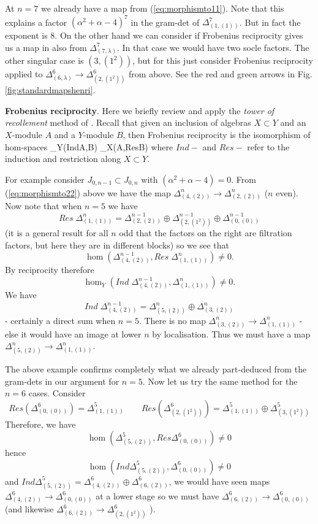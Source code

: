 At $n=7$ we already have a map from (\ref{eq:morphismto11}). 
Note that this explains a factor $(\alpha^2+\alpha-4)^7$ in the gram-det of $\Delta^7_{(1,(1))}$. 
But in fact the exponent is 8. 
On the other hand we can consider if Frobenius reciprocity gives us a map in 
also from $ \Delta^7_{(7,\lambda)}$.  
In that case we would have two socle factors. 
The other singular case is $(3,(1^2))$, but for this just consider Frobenius reciprocity applied to 
$   \Delta^6_{(6,\lambda)} \rightarrow   \Delta^6_{(2,(1^2))}  $ 
from above. 
See the red and green arrows in Fig.\ref{fig:standardmapshenri}. 

\mdef  \label{pa:FR}   {\bf{Frobenius reciprocity}}. 
Here we briefly review and apply the {\em tower of recollement} method of \cite{ToR}. 
Recall that given an inclusion of algebras $ X \subset Y$ and an $X$-module $A$ and
a $Y$-module $B$, 
then Frobenius reciprocity is the isomorphism of hom-spaces
\beq \label{eq:FR} 
\hom_Y(Ind\;A,B) \cong \hom_X(A,Res\;B)
\eq 
where $Ind-$ and $Res-$ refer to the induction and restriction along $ X \subset Y$. 

\mdef   \label{exa:henri1}
For example consider $J_{0,n-1} \subset J_{0,n}$ with $(\alpha^2+\alpha-4)=0$. 
From (\ref{eq:morphismto22}) above we have the map  
$ \Delta^n_{(4,(2))}  \rightarrow \Delta^n_{(2,(2))} $ ($n$ even). 
Now note that when $n=5$ we have 
\[
Res \; \Delta^n_{(1,(1))} =  \Delta^{n-1}_{(2,(2))} \oplus \Delta^{n-1}_{(2,(1^2))} \oplus \Delta^{n-1}_{(0,(0))}
\]
(it is a general result for all $n$ odd that the factors on the right are filtration factors, but here they are in different blocks)
so we see that 
$$
\hom(\Delta^{n-1}_{(4,(2))}, Res \; \Delta^n_{(1,(1))}) \neq 0   .
$$ 
By reciprocity therefore 
$$
\hom_Y(Ind\; \Delta^{n-1}_{(4,(2))},  \Delta^{n}_{(1,(1))}) \neq 0   .
$$ 
We have 
\[
Ind\; \Delta^{n-1}_{(4,(2))} = \Delta^n_{(5,(2))} \oplus \Delta^n_{(3,(2))}
\]
- certainly a direct sum when $n=5$. There is no map 
$ \Delta^n_{(3,(2))} \rightarrow \Delta^n_{(1,(1))} $ 
- else it would have an image at lower $n$ by localisation. 
Thus we must have a map $ \Delta^n_{(5,(2))} \rightarrow \Delta^n_{(1,(1))} $. 

\medskip 

The above example  confirms completely what we already part-deduced from the gram-dets in our argument for $n=5$. 
Now let us try the same method for the $n=6$ cases. 
Consider
\[Res(\Delta^6_{(0,(0))})= \Delta^5_{(1,(1))}  \qquad  Res(\Delta^6_{(2,(1^2))})= \Delta^5_{(1,(1))}\oplus \Delta^5_{(3,(1^2))}\]
Therefore, we have 
\[  \hom(\Delta^5_{(5,(2))}, Res\Delta^6_{(0,(0))})\neq 0\]
hence
\[\hom(Ind\Delta^5_{(5,(2))}, \Delta^6_{(0,(0))})\neq 0\]
and $Ind\Delta^5_{(5,(2))}=\Delta^6_{(4,(2))} \oplus \Delta^6_{(6,(2))}$, we would have seen maps $\Delta^6_{(4,(2))}\to \Delta^6_{(0,(0))}$ at a lower stage so we must have $\Delta^6_{(6,(2))}\to \Delta^6_{(0,(0))}$ (and likewise $\Delta^6_{(6,(2))}\to \Delta^6_{(2,(1^2))}$ ).
